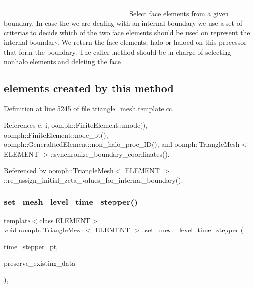 ===================================================================== Select face elements from a given boundary. In case the we are dealing with an internal boundary we use a set of criterias to decide which of the two face elements should be used on represent the internal boundary. We return the face elements, halo or haloed on this processor that form the boundary. The caller method should be in charge of selecting nonhalo elements and deleting the face \subsection*{elements created by this method }

Definition at line 5245 of file triangle\+\_\+mesh.\+template.\+cc.



References e, i, oomph\+::\+Finite\+Element\+::nnode(), oomph\+::\+Finite\+Element\+::node\+\_\+pt(), oomph\+::\+Generalised\+Element\+::non\+\_\+halo\+\_\+proc\+\_\+\+I\+D(), and oomph\+::\+Triangle\+Mesh$<$ E\+L\+E\+M\+E\+N\+T $>$\+::synchronize\+\_\+boundary\+\_\+coordinates().



Referenced by oomph\+::\+Triangle\+Mesh$<$ E\+L\+E\+M\+E\+N\+T $>$\+::re\+\_\+assign\+\_\+initial\+\_\+zeta\+\_\+values\+\_\+for\+\_\+internal\+\_\+boundary().

\mbox{\label{classoomph_1_1TriangleMesh_abb1a6cb242b5d0e067a8e64b3ac50cfb}} 
\subsubsection{\texorpdfstring{set\+\_\+mesh\+\_\+level\+\_\+time\+\_\+stepper()}{set\_mesh\_level\_time\_stepper()}}
{\footnotesize\ttfamily template$<$class E\+L\+E\+M\+E\+NT$>$ \\
void \hyperlink{classoomph_1_1TriangleMesh}{oomph\+::\+Triangle\+Mesh}$<$ E\+L\+E\+M\+E\+NT $>$\+::set\+\_\+mesh\+\_\+level\+\_\+time\+\_\+stepper (\begin{DoxyParamCaption}\item[{\hyperlink{classoomph_1_1TimeStepper}{Time\+Stepper} $\ast$const \&}]{time\+\_\+stepper\+\_\+pt,  }\item[{const bool \&}]{preserve\+\_\+existing\+\_\+data }\end{DoxyParamCaption})\hspace{0.3cm}{\ttfamily [inline]}, {\ttfamily [virtual]}}



